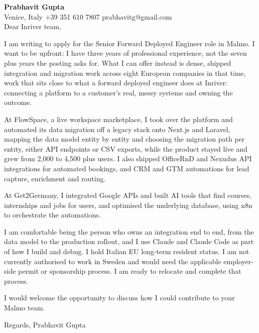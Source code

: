 \documentclass[a4paper,10.5pt]{article}
\begin{document}
\textbf{Prabhavit Gupta}\\
Venice, Italy \textbar{} +39 351 610 7807 \textbar{} prabhavitg@gmail.com\\[10pt]
Dear Inriver team,

I am writing to apply for the Senior Forward Deployed Engineer role in Malmo. I want to be upfront: I have three years of professional experience, not the seven plus years the posting asks for. What I can offer instead is dense, shipped integration and migration work across eight European companies in that time, work that sits close to what a forward deployed engineer does at Inriver: connecting a platform to a customer's real, messy systems and owning the outcome.

At FlowSpace, a live workspace marketplace, I took over the platform and automated its data migration off a legacy stack onto Next.js and Laravel, mapping the data model entity by entity and choosing the migration path per entity, either API endpoints or CSV exports, while the product stayed live and grew from 2,000 to 4,500 plus users. I also shipped OfficeRnD and Nexudus API integrations for automated bookings, and CRM and GTM automations for lead capture, enrichment and routing.

At Get2Germany, I integrated Google APIs and built AI tools that find courses, internships and jobs for users, and optimised the underlying database, using n8n to orchestrate the automations.

I am comfortable being the person who owns an integration end to end, from the data model to the production rollout, and I use Claude and Claude Code as part of how I build and debug. I hold Italian EU long-term resident status. I am not currently authorised to work in Sweden and would need the applicable employer-side permit or sponsorship process. I am ready to relocate and complete that process.

I would welcome the opportunity to discuss how I could contribute to your Malmo team.

Regards,
Prabhavit Gupta
\end{document}
